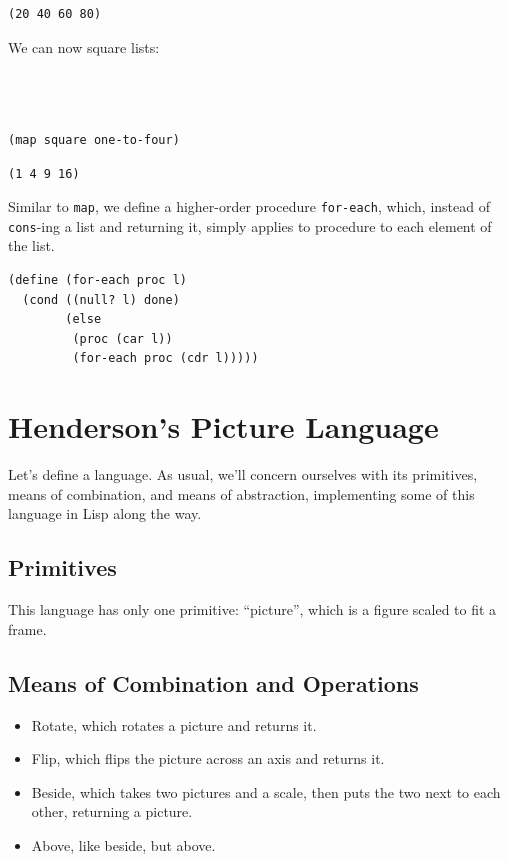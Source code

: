 \documentclass[9pt]{report}
\begin{document}
\begin{verbatim}
(20 40 60 80)
\end{verbatim}


We can now square lists:
\begin{verbatim}



(map square one-to-four)
\end{verbatim}

\begin{verbatim}
(1 4 9 16)
\end{verbatim}


Similar to \texttt{map}, we define a higher-order procedure \texttt{for-each},
which, instead of \texttt{cons}-ing a list and returning it, simply
applies to procedure to each element of the list.

\begin{verbatim}
(define (for-each proc l)
  (cond ((null? l) done)
        (else
         (proc (car l))
         (for-each proc (cdr l)))))
\end{verbatim}

\section{Henderson's Picture Language}
\label{sec:org7a5a94a}

Let's define a language. As usual, we'll concern ourselves with its
primitives, means of combination, and means of abstraction,
implementing some of this language in Lisp along the way.


\subsection{Primitives}
\label{sec:org804f49b}
This language has only one primitive: ``picture'', which is a figure
scaled to fit a frame.


\subsection{Means of Combination and Operations}
\label{sec:org4c9837c}

\begin{itemize}
\item Rotate, which rotates a picture and returns it.
\item Flip, which flips the picture across an axis and returns it.
\item Beside, which takes two pictures and a scale, then puts the two
next to each other, returning a picture.
\item Above, like beside, but above.
\end{itemize}
\end{document}
